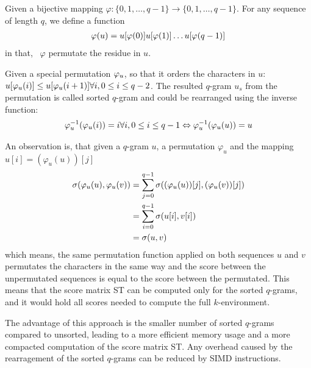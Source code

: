 Given a bijective mapping \(\varphi:\{0,1,\ldots,q-1\}\to \{0,1,\ldots,q-1\}\). For any sequence of length \(q\),  we define a function
\begin{align}
\varphi(u)=u\lbrack \varphi(0)\rbrack u\lbrack \varphi(1)\rbrack\ldots u\lbrack \varphi(q-1)\rbrack  
\end{align}
in that, \ \(\varphi\) permutate the residue in \(u\).

Given a special permutation \(\varphi_{u}\), so that it orders the characters in \(u\): \(u\lbrack \varphi_{u}(i)\rbrack\leq u\lbrack \varphi_{u}(i+1)\rbrack\forall i, 0\leq i\leq q-2\). The resulted \(q\)-gram \(u_s\) from the permutation is called sorted \(q\)-gram and could be rearranged using the inverse function:
\begin{align}
\varphi_{u}^{-1}(\varphi_{u}(i))=i \forall i, 0\leq i\leq q-1 \Leftrightarrow \varphi_{u}^{-1}(\varphi_{u}(u))=u
\end{align}

An observation is, that given a \(q\)-gram \(u\), a permutation \(\varphi_u\) and the mapping \(u[i] = (\varphi_u (u))[j]\)
\begin{align}
\sigma(\varphi_{u}(u),\varphi_{u}(v)) &= \sum_{j=0}^{q-1} \sigma ((\varphi_u (u))[j], (\varphi_u (v))[j])\\  
&= \sum_{i=0}^{q-1} \sigma (u[i],v[i]) \\
&= \sigma(u,v)
\end{align}
which means, the same permutation function applied on both sequences \(u\) and \(v\)
permutates the characters in the same way and the score between the unpermutated sequences is equal to the score between the permutated. This means that the score matrix ST can be computed only for the sorted \(q\)-grams, and it would hold all scores needed to compute the full $k$-environment.

The advantage of this approach is the smaller number of sorted $q$-grams compared to unsorted, leading to a more efficient memory usage and a more compacted computation of the score matrix ST. Any overhead caused by the rearragement of the sorted $q$-grams can be reduced by SIMD instructions.